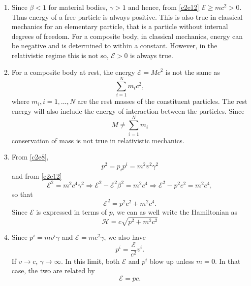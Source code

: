 \begin{enumerate}
\item Since $\beta < 1$ for material bodies, $\gamma > 1$ and hence, from 
\eqref{c2e12} $\mathcal{E} \ge mc^2 > 0$. Thus energy of a free particle is 
always positive.  This is also true in classical mechanics for an elementary 
particle, that is a particle without internal degrees of freedom. For a 
composite body, in classical mechanics, energy can be negative and is 
determined to within a constant. However, in the relativistic regime this is 
not so, $\mathcal{E} > 0$ is always true.

\item For a composite body at rest, the energy $\mathcal{E} = Mc^2$ is not the 
same as 
\[
\sum_{i=1}^N m_ic^2,
\]
where $m_i, i = 1, \ldots, N$ are the rest masses of the constituent particles.
The rest energy will also include the energy of interaction between the 
particles.
Since 
\[
M \ne \sum_{i=1}^N m_i
\]
conservation of mass is not true in relativistic mechanics.

\item From \eqref{c2e8},
\[
p^2 = p_ip^i = m^2v^2\gamma^2
\]
and from \eqref{c2e12}
\[
\mathcal{E}^2 = m^2c^4\gamma^2 \Rightarrow \mathcal{E}^2 - \mathcal{E}^2\beta^2 
= m^2c^4 \Rightarrow \mathcal{E}^2 - p^2c^2  = m^2c^4,
\]
so that
\begin{equation}\label{c2e15}
\mathcal{E}^2 = p^2c^2 + m^2c^4.
\end{equation}
Since $\mathcal{E}$ is expressed in terms of $p$, we can as well write the 
Hamiltonian as
\begin{equation}\label{c2e16}
\mathcal{H} = c\sqrt{p^2 + m^2c^2}
\end{equation}

\item Since $p^i = mv^i\gamma$ and $\mathcal{E} = mc^2\gamma$, we also have
\begin{equation}\label{c2e17}
p^i = \frac{\mathcal{E}}{c^2}v^i.
\end{equation}
If $v \rightarrow c$, $\gamma \rightarrow \infty$. In this limit, both 
$\mathcal{E}$ and $p^i$ blow up unless $m = 0$. In that case, the two are 
related by
\begin{equation}\label{c2e18}
\mathcal{E} = pc.
\end{equation}


\end{enumerate}
